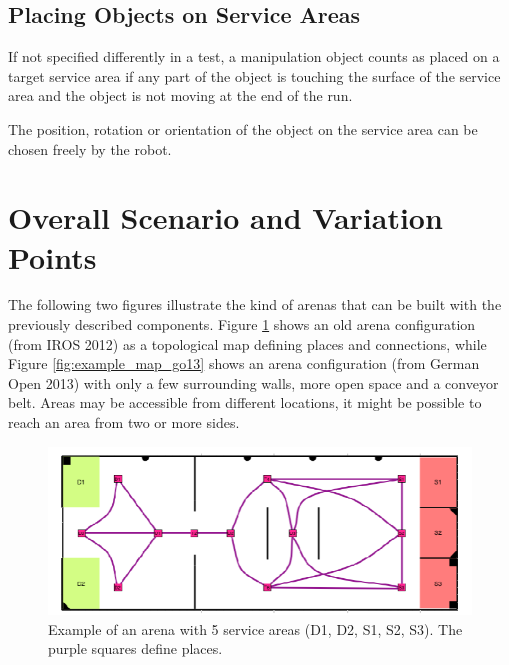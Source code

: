 \subsection{Placing Objects on Service Areas}
If not specified differently in a test, a manipulation object counts as placed on a target service area if any part of the object is touching the surface of the service area and the object is not moving at the end of the run.
\par
The position, rotation or orientation of the object on the service area can be chosen freely by the robot.

\section{Overall Scenario and Variation Points}
The following two figures illustrate the kind of arenas that can be built with the previously described components. Figure \ref{fig:example_map} shows an old arena configuration (from IROS 2012) as a topological map defining places and connections, while Figure \ref{fig:example_map_go13} shows an arena configuration (from German Open 2013) with only a few surrounding walls, more open space and a conveyor belt. 
Areas may be accessible from different locations, it might be possible to reach an area from two or more sides.

\begin{figure}
\includegraphics[width= \textwidth ]{../images/example_map.png}
\caption{Example of an arena with 5 service areas (D1, D2, S1, S2, S3). The purple squares define places.}
\label{fig:example_map}
\end{figure}

